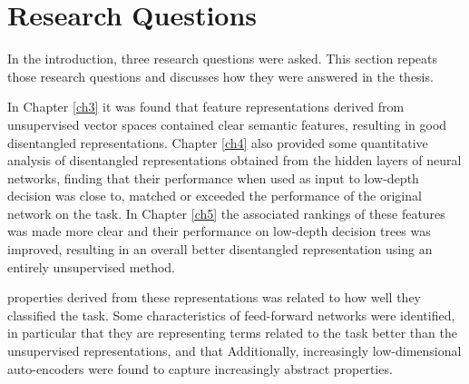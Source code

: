 
\section{Research Questions}

In the introduction, three research questions were asked. This section repeats those research questions and discusses how they were answered in the thesis.


In Chapter \ref{ch3} it was found that feature representations derived from unsupervised vector spaces contained clear semantic features, resulting in good disentangled representations. Chapter \ref{ch4} also provided some quantitative analysis of  disentangled representations obtained from the hidden layers of neural networks, finding that their performance when used as input to low-depth decision  was close to, matched or exceeded the performance of the original network on the task. In Chapter \ref{ch5} the associated rankings of these features was made more clear and their performance on low-depth decision trees was improved, resulting in an overall better disentangled representation using an entirely unsupervised method.


 properties derived from these representations was related to how well they classified the task.  Some characteristics of feed-forward networks were identified, in particular that they are representing terms related to the task better than the unsupervised representations, and that  Additionally, increasingly low-dimensional auto-encoders were found to capture increasingly abstract properties.

